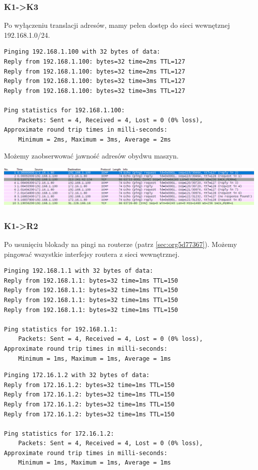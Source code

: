 \documentclass[11pt]{article}
\begin{document}
\subsubsection{K1->K3}
\label{sec:orgac8ecbb}
Po wyłączeniu translacji adresów, mamy pełen dostęp do sieci wewnętznej 192.168.1.0/24.
\begin{verbatim}
Pinging 192.168.1.100 with 32 bytes of data:
Reply from 192.168.1.100: bytes=32 time=2ms TTL=127
Reply from 192.168.1.100: bytes=32 time=2ms TTL=127
Reply from 192.168.1.100: bytes=32 time=3ms TTL=127
Reply from 192.168.1.100: bytes=32 time=3ms TTL=127

Ping statistics for 192.168.1.100:
    Packets: Sent = 4, Received = 4, Lost = 0 (0% loss),
Approximate round trip times in milli-seconds:
    Minimum = 2ms, Maximum = 3ms, Average = 2ms
\end{verbatim}
Możemy zaobserwować jawność adresów obydwu maszyn.
\begin{center}
\includegraphics[width=.9\linewidth]{./K3/ping_z_K1.png}
\end{center}
\subsubsection{K1->R2}
\label{sec:orgfaf5acc}
Po usunięciu blokady na pingi na routerze (patrz \ref{sec:org5d77367}). Możemy pingować wszystkie interfejsy routera z sieci wewnętrznej.
\begin{verbatim}
Pinging 192.168.1.1 with 32 bytes of data:
Reply from 192.168.1.1: bytes=32 time=1ms TTL=150
Reply from 192.168.1.1: bytes=32 time=1ms TTL=150
Reply from 192.168.1.1: bytes=32 time=1ms TTL=150
Reply from 192.168.1.1: bytes=32 time=1ms TTL=150

Ping statistics for 192.168.1.1:
    Packets: Sent = 4, Received = 4, Lost = 0 (0% loss),
Approximate round trip times in milli-seconds:
    Minimum = 1ms, Maximum = 1ms, Average = 1ms
\end{verbatim}
\begin{verbatim}
Pinging 172.16.1.2 with 32 bytes of data:
Reply from 172.16.1.2: bytes=32 time=1ms TTL=150
Reply from 172.16.1.2: bytes=32 time=1ms TTL=150
Reply from 172.16.1.2: bytes=32 time=1ms TTL=150
Reply from 172.16.1.2: bytes=32 time=1ms TTL=150

Ping statistics for 172.16.1.2:
    Packets: Sent = 4, Received = 4, Lost = 0 (0% loss),
Approximate round trip times in milli-seconds:
    Minimum = 1ms, Maximum = 1ms, Average = 1ms
\end{verbatim}
\end{document}
